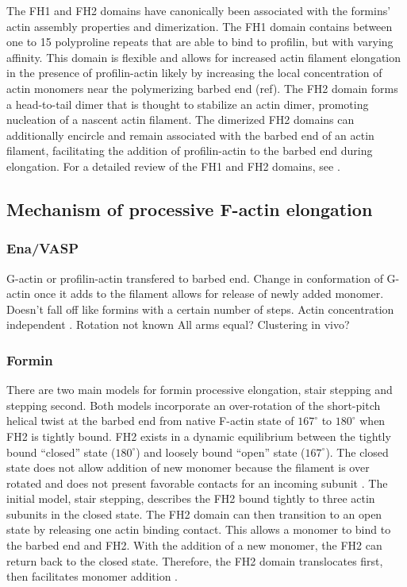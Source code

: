 The FH1 and FH2 domains have canonically been associated with the formins' actin assembly properties and dimerization. The FH1 domain contains between one to 15 polyproline repeats that are able to bind to profilin, but with varying affinity. This domain is flexible and allows for increased actin filament elongation in the presence of profilin-actin likely by increasing the local concentration of actin monomers near the polymerizing barbed end (ref). The FH2 domain forms a head-to-tail dimer that is thought to stabilize an actin dimer, promoting nucleation of a nascent actin filament. The dimerized FH2 domains can additionally encircle and remain associated with the barbed end of an actin filament, facilitating the addition of profilin-actin to the barbed end during elongation. For a detailed review of the FH1 and FH2 domains, see \citep{paul_review_2009}. 

\subsection{Mechanism of processive F-actin elongation}\label{ena-formin mechanism}

\subsubsection{Ena/VASP}
G-actin or profilin-actin transfered to barbed end. Change in conformation of G-actin once it adds to the filament allows for release of newly added monomer. 
Doesn't fall off like formins with a certain number of steps. Actin concentration independent \citep{hansen_vasp_2010}.
Rotation not known
All arms equal?
Clustering in vivo?

\subsubsection{Formin}

There are two main models for formin processive elongation, stair stepping and stepping second. Both models incorporate an over-rotation of the short-pitch helical twist at the barbed end from native F-actin state of $167^{\circ}$ to $180^{\circ}$ when FH2 is tightly bound. FH2 exists in a dynamic equilibrium between the tightly bound “closed” state ($180^{\circ}$) and loosely bound “open” state ($167^{\circ}$). The closed state does not allow addition of new monomer because the filament is over rotated and does not present favorable contacts for an incoming subunit \citep{otomo_structural_2005}. The initial model, stair stepping, describes the FH2 bound tightly to three actin subunits in the closed state. The FH2 domain can then transition to an open state by releasing one actin binding contact. This allows a monomer to bind to the barbed end and FH2. With the addition of a new monomer, the FH2 can return back to the closed state. Therefore, the FH2 domain translocates first, then facilitates monomer addition \citep{otomo_structural_2005}. 

